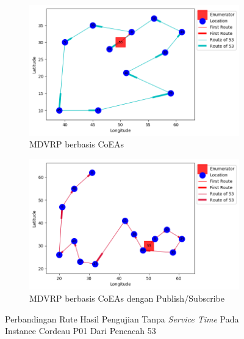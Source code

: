 \begin{figure}[H]
	\centering
	\begin{subfigure}[t]{\textwidth}
		\centering
		\includegraphics[width=\textwidth]{Resources/Images/cordeau_p01/cordeau_p01_notw_53_coes}
		\caption{MDVRP berbasis CoEAs}
		\label{fig:cordeau_p01_notw_53_coes}
	\end{subfigure}
	\begin{subfigure}[t]{\textwidth}
		\centering
		\includegraphics[width=\textwidth]{Resources/Images/cordeau_p01/cordeau_p01_notw_53_pubsub_coes}
		\caption{MDVRP berbasis CoEAs dengan Publish/Subscribe}
		\label{fig:cordeau_p01_notw_53_pubsub_coes}
	\end{subfigure}
	\caption{Perbandingan Rute Hasil Pengujian Tanpa \textit{Service Time} Pada Instance Cordeau P01 Dari Pencacah 53}
	\label{fig:cordeau_p01_notw_53}
\end{figure}


